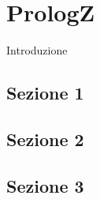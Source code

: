 \chapter{PrologZ} %

\label{Chapter2} %

Introduzione


\section{Sezione 1}


\section{Sezione 2}


\section{Sezione 3}
